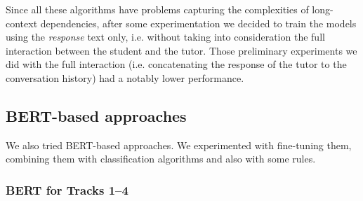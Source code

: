 \documentclass[11pt]{article}
\begin{document}
Since all these algorithms have problems capturing the complexities of long-context 
dependencies, after some experimentation we decided to train the models using the \textit{response} text only, i.e. without taking into consideration the full interaction between the student and the tutor.
Those preliminary experiments we did with the full interaction (i.e. concatenating the response of the tutor to the conversation history) had a notably lower performance.



\subsection{BERT-based approaches}

We also tried BERT-based approaches.
We experimented with fine-tuning them, combining them with classification algorithms and also with some rules. 

\subsubsection{BERT for Tracks 1--4}
\end{document}
